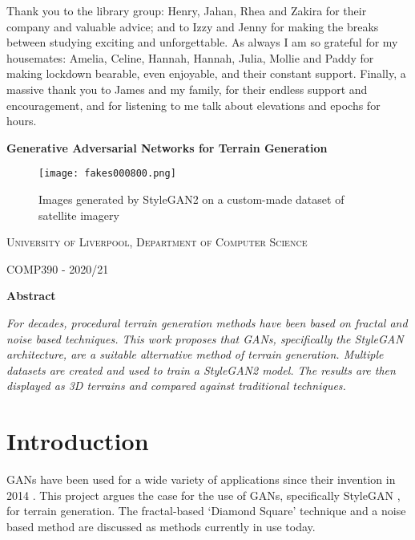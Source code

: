 \documentclass[a4paper]{report}
\begin{document}

Thank you to the library group: Henry, Jahan, Rhea and Zakira for their company and valuable advice; and to Izzy and Jenny for making the breaks between studying exciting and unforgettable. As always I am so grateful for my housemates: Amelia, Celine, Hannah, Hannah, Julia, Mollie and Paddy for making lockdown bearable, even enjoyable, and their constant support. Finally, a massive thank you to James and my family, for their endless support and encouragement, and for listening to me talk about elevations and epochs for hours.

\newpage
\begin{center}
\textbf{\Large Generative Adversarial Networks for Terrain Generation}
\vspace{2em}
\end{center}

\begin{figure}[H]
    \centering
        \texttt{[image: fakes000800.png]}
        \caption{Images generated by StyleGAN2 on a custom-made dataset of satellite imagery}
        \label{fig:title}
\end{figure}

\vspace{1em}

\begin{center}
    \textsc{University of Liverpool, Department of Computer Science}
\end{center}
\begin{center}
    \textsc{COMP390 - 2020/21}
\end{center}

\vspace{3em}

\begin{center}
\textbf{Abstract}
\end{center}
\begin{addmargin}[5em]{5em}
\textit{For decades, procedural terrain generation methods have been based on fractal and noise based techniques. This work proposes that GANs, specifically the StyleGAN architecture, are a suitable alternative method of terrain generation. Multiple datasets are created and used to train a StyleGAN2 model. The results are then displayed as 3D terrains and compared against traditional techniques.}
\end{addmargin}

\newpage
\tableofcontents
\newpage
\section{Introduction}
GANs have been used for a wide variety of applications since their invention in 2014 \cite{goodfellow2014generative}. This project argues the case for the use of GANs, specifically StyleGAN \cite{stylegan}, for terrain generation. The fractal-based `Diamond Square' technique and a noise based method are discussed as methods currently in use today.
\end{document}
